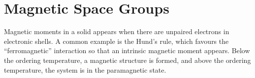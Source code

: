 %
%
%
%
%
%
%
%
%
%

\section{Magnetic Space Groups}

Magnetic moments in a solid appears when there are unpaired electrons in electronic shells. A common example is the Hund's rule, which favours the ``ferromagnetic'' interaction so that an intrinsic magnetic moment appears. Below the ordering temperature, a magnetic structure is formed, and above the ordering temperature, the system is in the paramagnetic state.

